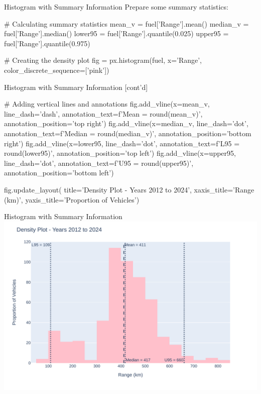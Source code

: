 \documentclass[ignorenonframetext,xcolor=x11names]{beamer}
\begin{document}
\begin{frame}[fragile]{Histogram with Summary Information}
Prepare some summary statistics:

\footnotesize
\begin{pythoncode}
# Calculating summary statistics
mean_v = fuel['Range'].mean()
median_v = fuel['Range'].median()
lower95 = fuel['Range'].quantile(0.025)
upper95 = fuel['Range'].quantile(0.975)

# Creating the density plot
fig = px.histogram(fuel, x='Range', 
         color_discrete_sequence=['pink'])
\end{pythoncode}
\end{frame}

\begin{frame}[fragile]{Histogram with Summary Information \small [cont'd]}
\footnotesize
\begin{pythoncode}
# Adding vertical lines and annotations
fig.add_vline(x=mean_v, line_dash='dash', 
      annotation_text=f'Mean = {round(mean_v)}', 
      annotation_position='top right')
fig.add_vline(x=median_v, line_dash='dot', 
      annotation_text=f'Median = {round(median_v)}', 
      annotation_position='bottom right')
fig.add_vline(x=lower95, line_dash='dot', 
      annotation_text=f'L95 = {round(lower95)}', 
      annotation_position='top left')
fig.add_vline(x=upper95, line_dash='dot', 
      annotation_text=f'U95 = {round(upper95)}', 
      annotation_position='bottom left')

fig.update_layout(
    title='Density Plot - Years 2012 to 2024',
    xaxis_title='Range (km)',
    yaxis_title='Proportion of Vehicles')
\end{pythoncode}
\end{frame}

\begin{frame}{Histogram with Summary Information}
    \includegraphics[width=\textwidth]{px.histogram2.pdf}
\end{frame}
\end{document}
